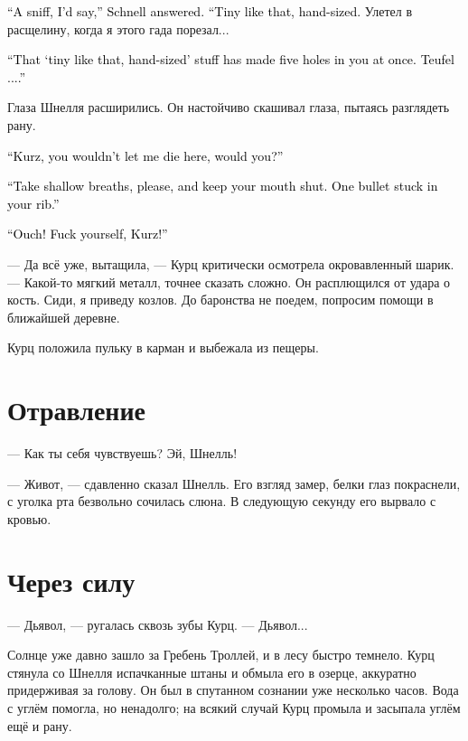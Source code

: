 \documentclass[a4paper,10pt,fleqn]{book}\usepackage{polyglossia}\setdefaultlanguage{english}\setotherlanguage{russian}\defaultfontfeatures{Ligatures=TeX,Mapping=tex-text}\usepackage{xcolor}\definecolor{lightgray}{HTML}{bbbbbb}\color{lightgray}\newcommand{\ml}[3]{\textcolor{black}{#3}}
\begin{document}
\ml{$0$}
{--- Скорее фыркнул, --- задумался Шнелль.}
{``A sniff, I'd say,'' Schnell answered.}
\ml{$0$}
{--- Вот такой маленький, размером с ладошку.}
{``Tiny like that, hand-sized.}
Улетел в расщелину, когда я этого гада порезал...

\ml{$0$}
{--- Этот <<маленький, размером с ладошку>> понаделал в тебе пять дырок одним залпом.}
{``That `tiny like that, hand-sized' stuff has made five holes in you at once.}
\ml{$0$}
{Дьявол...}
{Teufel ....''}

Глаза Шнелля расширились.
Он настойчиво скашивал глаза, пытаясь разглядеть рану.

\ml{$0$}
{--- Курц, ты же не дашь мне сдохнуть здесь, правда?}
{``Kurz, you wouldn't let me die here, would you?''}

\ml{$0$}
{--- Дыши мелкими глотками, пожалуйста, и заткнись.}
{``Take shallow breaths, please, and keep your mouth shut.}
\ml{$0$}
{Одна пулька застряла в ребре.}
{One bullet stuck in your rib.''}

\ml{$0$}
{--- Ай!}
{``Ouch!}
\ml{$0$}
{Чёрт бы тебя побрал, Курц!}
{Fuck yourself, Kurz!''}

--- Да всё уже, вытащила, --- Курц критически осмотрела окровавленный шарик.
--- Какой-то мягкий металл, точнее сказать сложно.
Он расплющился от удара о кость.
Сиди, я приведу козлов.
До баронства не поедем, попросим помощи в ближайшей деревне.

Курц положила пульку в карман и выбежала из пещеры.

\section{Отравление}

--- Как ты себя чувствуешь?
Эй, Шнелль!

--- Живот, --- сдавленно сказал Шнелль.
Его взгляд замер, белки глаз покраснели, с уголка рта безвольно сочилась слюна.
В следующую секунду его вырвало с кровью.

\section{Через силу}

--- Дьявол, --- ругалась сквозь зубы Курц.
--- Дьявол...

Солнце уже давно зашло за Гребень Троллей, и в лесу быстро темнело.
Курц стянула со Шнелля испачканные штаны и обмыла его в озерце, аккуратно придерживая за голову.
Он был в спутанном сознании уже несколько часов.
Вода с углём помогла, но ненадолго;
на всякий случай Курц промыла и засыпала углём ещё и рану.
\end{document}
